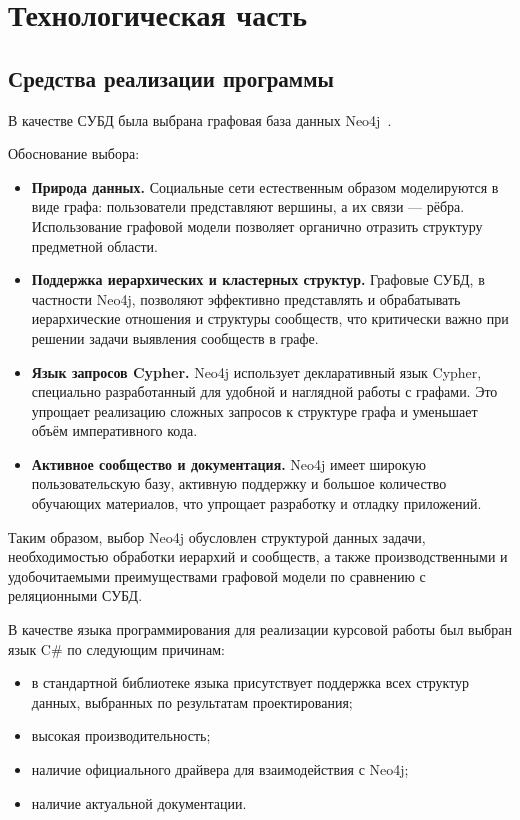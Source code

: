 \chapter{Технологическая часть}

\section{Средства реализации программы}

В качестве СУБД была выбрана графовая база данных Neo4j~\cite{neo4j}.

Обоснование выбора:
\begin{itemize}
    \item \textbf{Природа данных.} Социальные сети естественным образом моделируются в виде графа: пользователи представляют вершины, а их связи — рёбра. Использование графовой модели позволяет органично отразить структуру предметной области.
    
    \item \textbf{Поддержка иерархических и кластерных структур.} Графовые СУБД, в частности Neo4j, позволяют эффективно представлять и обрабатывать иерархические отношения и структуры сообществ, что критически важно при решении задачи выявления сообществ в графе.
    
    \item \textbf{Язык запросов Cypher.} Neo4j использует декларативный язык Cypher, специально разработанный для удобной и наглядной работы с графами. Это упрощает реализацию сложных запросов к структуре графа и уменьшает объём императивного кода.
    
    \item \textbf{Активное сообщество и документация.} Neo4j имеет широкую пользовательскую базу, активную поддержку и большое количество обучающих материалов, что упрощает разработку и отладку приложений.
\end{itemize}

Таким образом, выбор Neo4j обусловлен структурой данных задачи, необходимостью обработки иерархий и сообществ, а также производственными и удобочитаемыми преимуществами графовой модели по сравнению с реляционными СУБД.

В качестве языка программирования для реализации курсовой работы был
выбран язык C\# по следующим причинам:

\begin{itemize}
\item в стандартной библиотеке языка присутствует поддержка всех
структур данных, выбранных по результатам проектирования;
\item высокая производительность;
\item наличие официального драйвера для взаимодействия с Neo4j;
\item наличие актуальной документации.
\end{itemize}

